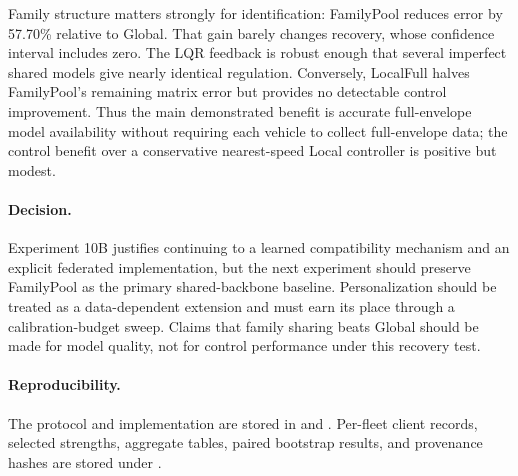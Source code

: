 Family structure matters strongly for identification: FamilyPool reduces error
by 57.70\% relative to Global. That gain barely changes recovery, whose
confidence interval includes zero. The LQR feedback is robust enough that
several imperfect shared models give nearly identical regulation. Conversely,
LocalFull halves FamilyPool's remaining matrix error but provides no detectable
control improvement. Thus the main demonstrated benefit is accurate
full-envelope model availability without requiring each vehicle to collect
full-envelope data; the control benefit over a conservative nearest-speed Local
controller is positive but modest.

\paragraph{Decision.}
Experiment 10B justifies continuing to a learned compatibility mechanism and an
explicit federated implementation, but the next experiment should preserve
FamilyPool as the primary shared-backbone baseline. Personalization should be
treated as a data-dependent extension and must earn its place through a
calibration-budget sweep. Claims that family sharing beats Global should be made
for model quality, not for control performance under this recovery test.

\paragraph{Reproducibility.}
The protocol and implementation are stored in
 and
. Per-fleet
client records, selected strengths, aggregate tables, paired bootstrap results,
and provenance hashes are stored under .
